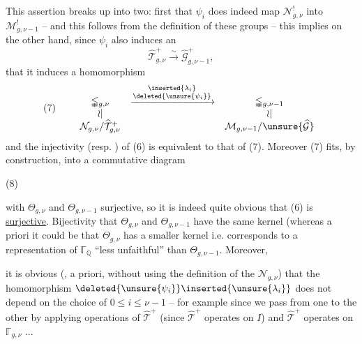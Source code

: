 This assertion breaks up into two: first  that $\psi_i$ does indeed map $\mathcal N_{g,\nu}^{!}$ into $\mathcal M_{g,\nu-1}^{!}$ -- and this follows from the  definition of these groups -- this implies on the other hand, since $\psi_i$ also induces an  
\[
\widehat{\mathcal T}_{g,\nu}^{+}
\xrightarrow{\sim}
\widehat{\mathcal G}_{g,\nu-1}^{+},
\]
that it induces a homomorphism
\[
(7)\qquad
\begin{array}{ccc}
\mathbb{\Gamma}_{g,\nu}
&\xrightarrow{\substack{\inserted{\lambda_i}\\\deleted{\unsure{\psi_i}}}}&
\mathbb{\Gamma}_{g,\nu-1}\\
\wr\vert&&\wr\vert\\
\mathcal N_{g,\nu}/\widehat{\mathcal T}_{g,\nu}^{+}
&&\mathcal M_{g,\nu-1}/\unsure{\widehat{\mathcal G}}
\end{array}
\]
and the injectivity (resp. ) of (6) is equivalent to that of (7). Moreover (7) fits, by construction, into a commutative diagram

\begin{samepage}
(8)\quad{}
\end{samepage}

with $\Theta_{g,\nu}$ and $\Theta_{g,\nu-1}$ surjective, so it is indeed quite obvious that (6) is \uline{surjective}. Bijectivity  that $\Theta_{g,\nu}$ and $\Theta_{g,\nu-1}$ have the same kernel (whereas a priori it could be that $\Theta_{g,\nu}$ has a smaller kernel i.e. corresponds to a representation of $\mathbb{\Gamma}_{\mathbb Q}$ ``less unfaithful'' than $\Theta_{g,\nu-1}$. Moreover,


it is obvious  (, a priori, without using the definition   of the $\mathcal N_{g,\nu}$) that the homomorphism $\deleted{\unsure{\psi_i}}\inserted{\unsure{\lambda_i}}$  does not depend on the choice of $0\leq i\leq\nu-1$ -- for example since we pass from one to the other by applying operations of $\widehat{\mathcal T}^{+}$ (since $\widehat{\mathcal T}^{+}$ operates  on $I$) and $\widehat{\mathcal T}^{+}$ operates  on $\mathbb{\Gamma}_{g,\nu}$ ...

